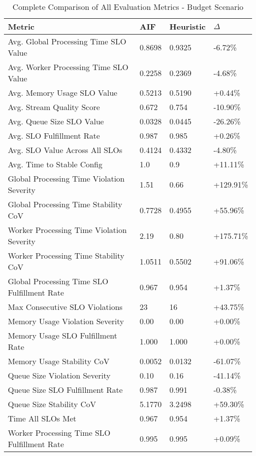 \begin{table}[h!]
\centering
\small
\caption{Complete Comparison of All Evaluation Metrics - Budget Scenario}
\label{tab:complete_results_variable_computational_budget}
\begin{tabular}{@{}llll@{}}
\toprule
\textbf{Metric} & \textbf{AIF} & \textbf{Heuristic} & \textbf{$\Delta$} \\
\midrule
Avg. Global Processing Time SLO Value & 0.8698 & 0.9325 & -6.72\% \\
Avg. Worker Processing Time SLO Value & 0.2258 & 0.2369 & -4.68\% \\
Avg. Memory Usage SLO Value & 0.5213 & 0.5190 & +0.44\% \\
Avg. Stream Quality Score & 0.672 & 0.754 & -10.90\% \\
Avg. Queue Size SLO Value & 0.0328 & 0.0445 & -26.26\% \\
Avg. SLO Fulfillment Rate & 0.987 & 0.985 & +0.26\% \\
Avg. SLO Value Across All SLOs & 0.4124 & 0.4332 & -4.80\% \\
Avg. Time to Stable Config & 1.0 & 0.9 & +11.11\% \\
Global Processing Time Violation Severity & 1.51 & 0.66 & +129.91\% \\
Global Processing Time Stability CoV & 0.7728 & 0.4955 & +55.96\% \\
Worker Processing Time Violation Severity & 2.19 & 0.80 & +175.71\% \\
Worker Processing Time Stability CoV & 1.0511 & 0.5502 & +91.06\% \\
Global Processing Time SLO Fulfillment Rate & 0.967 & 0.954 & +1.37\% \\
Max Consecutive SLO Violations & 23 & 16 & +43.75\% \\
Memory Usage Violation Severity & 0.00 & 0.00 & +0.00\% \\
Memory Usage SLO Fulfillment Rate & 1.000 & 1.000 & +0.00\% \\
Memory Usage Stability CoV & 0.0052 & 0.0132 & -61.07\% \\
Queue Size Violation Severity & 0.10 & 0.16 & -41.14\% \\
Queue Size SLO Fulfillment Rate & 0.987 & 0.991 & -0.38\% \\
Queue Size Stability CoV & 5.1770 & 3.2498 & +59.30\% \\
Time All SLOs Met & 0.967 & 0.954 & +1.37\% \\
Worker Processing Time SLO Fulfillment Rate & 0.995 & 0.995 & +0.09\% \\
\bottomrule
\end{tabular}
\end{table}